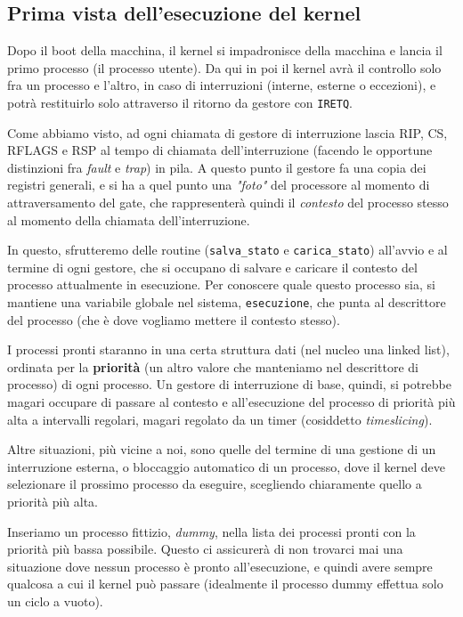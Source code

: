 \documentclass[a4paper,11pt]{article}
\begin{document}
\subsection{Prima vista dell'esecuzione del kernel}
Dopo il boot della macchina, il kernel si impadronisce della macchina e lancia il primo processo (il processo utente).
Da qui in poi il kernel avrà il controllo solo fra un processo e l'altro, in caso di interruzioni (interne, esterne o eccezioni), e potrà restituirlo solo attraverso il ritorno da gestore con \lstinline|IRETQ|.

Come abbiamo visto, ad ogni chiamata di gestore di interruzione lascia RIP, CS, RFLAGS e RSP al tempo di chiamata dell'interruzione (facendo le opportune distinzioni fra \textit{fault} e \textit{trap}) in pila.
A questo punto il gestore fa una copia dei registri generali, e si ha a quel punto una \textit{"foto"} del processore al momento di attraversamento del gate, che rappresenterà quindi il \textit{contesto} del processo stesso al momento della chiamata dell'interruzione.

In questo, sfrutteremo delle routine (\lstinline|salva_stato| e \lstinline|carica_stato|) all'avvio e al termine di ogni gestore, che si occupano di salvare e caricare il contesto del processo attualmente in esecuzione.
Per conoscere quale questo processo sia, si mantiene una variabile globale nel sistema, \lstinline|esecuzione|, che punta al descrittore del processo (che è dove vogliamo mettere il contesto stesso).

I processi pronti staranno in una certa struttura dati (nel nucleo una linked list), ordinata per la \textbf{priorità} (un altro valore che manteniamo nel descrittore di processo) di ogni processo.
Un gestore di interruzione di base, quindi, si potrebbe magari occupare di passare al contesto e all'esecuzione del processo di priorità più alta a intervalli regolari, magari regolato da un timer (cosiddetto \textit{timeslicing}).

Altre situazioni, più vicine a noi, sono quelle del termine di una gestione di un interruzione esterna, o bloccaggio automatico di un processo, dove il kernel deve selezionare il prossimo processo da eseguire, scegliendo chiaramente quello a priorità più alta.

Inseriamo un processo fittizio, \textit{dummy}, nella lista dei processi pronti con la priorità più bassa possibile.
Questo ci assicurerà di non trovarci mai una situazione dove nessun processo è pronto all'esecuzione, e quindi avere sempre qualcosa a cui il kernel può passare (idealmente il processo dummy effettua solo un ciclo a vuoto).
\end{document}
